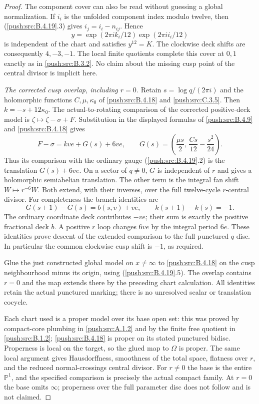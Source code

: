 \begin{proof}
The component cover can also be read without
guessing a global normalization. If $i_i$ is the
unfolded component index modulo twelve, then
(\ref{push:src:B.4.19}.3) gives $i_j=i_i-n_{ij}$. Hence
\[
 y=\exp(2\pi i k_i/12)\exp(2\pi i i_i/12)
\]
is independent of the chart and satisfies $y^{12}=K$.
The clockwise deck shifts are consequently $4,-3,-1$.
The local finite quotients complete this cover at
$0,1$ exactly as in \ref{push:src:B.3.2}. No claim about the missing
cusp point of the central divisor is implicit here.

\emph{The corrected cusp overlap, including $r=0$.}
Retain $s=\log q/(2\pi i)$ and the holomorphic
functions $C,\mu,\kappa_0$ of \ref{push:src:B.4.18} and \ref{push:src:C.3.5}.
Then $k=-s+12\kappa_0$. The actual-to-rotating
comparison of the corrected positive-deck model is
$\zeta\mapsto\zeta-\sigma+F$. Substitution in the
displayed formulas of \ref{push:src:B.4.9} and \ref{push:src:B.4.18} gives
\[
 F-\sigma=kve+G(s)+6ve,
 \qquad
 G(s)=\left(\frac{\mu s}{2},\,
                    \frac{Cs}{12}-\frac{s^2}{24}\right).
 \tag{B.4.19.5}
\]
Thus its comparison with the ordinary gauge
(\ref{push:src:B.4.19}.2) is the translation $G(s)+6ve$.
On a sector of $q\ne0$, $G$ is independent of $r$
and gives a holomorphic semiabelian translation.
The other term is the integral fan shift
$W\mapsto r^{-6}W$. Both extend, with their inverses,
over the full twelve-cycle $r$-central divisor.
For completeness the branch identities are
\[
 G(s+1)-G(s)=b(s,v)+ve,
 \qquad k(s+1)-k(s)=-1.
\]
The ordinary coordinate deck contributes $-ve$;
their sum is exactly the positive fractional deck
$b$. A positive $r$ loop changes $6ve$ by the
integral period $6e$. These identities prove
descent of the extended comparison to the full
punctured $q$ disc. In particular the common
clockwise cusp shift is $-1$, as required.

Glue the just constructed global model on
$x\ne\infty$ to \ref{push:src:B.4.18} on the cusp neighbourhood
minus its origin, using (\ref{push:src:B.4.19}.5). The overlap
contains $r=0$ and the map extends there by the
preceding chart calculation. All identities
retain the actual punctured marking; there is no
unresolved scalar or translation cocycle.

Each chart used is a proper model over its base
open set: this was proved by compact-core plumbing
in \ref{push:src:A.1.2} and by the finite free quotient in \ref{push:src:B.1.2};
\ref{push:src:B.4.18} is proper on its stated punctured bidisc.
Properness is local on the target, so the glued
map to $\Omega$ is proper. The same local argument
gives Hausdorffness, smoothness of the total space,
flatness over $r$, and the reduced normal-crossings
central divisor. For $r\ne0$ the base is the entire
$\mathbb P^1$, and the specified comparison is
precisely the actual compact family. At $r=0$ the
base omits $\infty$; properness over the full
parameter disc does not follow and is not claimed.


\end{proof}
